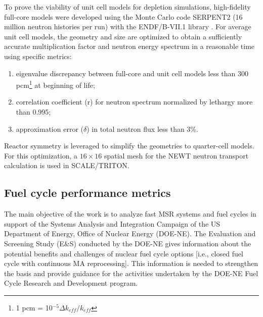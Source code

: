 \documentclass{anstrans}
\begin{document}
To prove the viability of unit cell models for depletion simulations, high-fidelity full-core models were developed using the Monte Carlo code SERPENT2 (16 million neutron histories per run) with the ENDF/B-VII.1 library \cite{leppanen_serpent_2015, chadwick_endf/b-vii.1_2011}. For average unit cell models, the geometry and size are optimized to obtain a sufficiently accurate multiplication factor and neutron energy spectrum in a reasonable time using specific metrics:
\vspace{-0.08in}
\begin{enumerate}
	\item eigenvalue discrepancy between full-core and unit cell models less than 300 pcm\footnote{ 1 pcm = 10$^{-5}\Delta k_{eff}/k_{eff}$} at beginning of life;\vspace{-0.11in}
	\item correlation coefficient (r) for neutron spectrum normalized by lethargy more than 0.995;\vspace{-0.11in}
	\item approximation error ($\delta$) in total neutron flux less than 3\%.\vspace{-0.08in}
\end{enumerate}
Reactor symmetry is leveraged to simplify the geometries to quarter-cell models. For this optimization, a $16\times 16$ spatial mesh for the NEWT neutron transport calculation is used in SCALE/TRITON.

\subsection{Fuel cycle performance metrics} 
\label{sec:metrics}
The main objective of the work is to analyze fast \gls{MSR} systems and fuel cycles in support of the Systems Analysis and Integration Campaign of the US Department of Energy, Office of Nuclear Energy (DOE-NE). The Evaluation and Screening Study (E\&S) conducted by the DOE-NE gives information about the potential benefits and challenges of nuclear fuel cycle options [i.e., closed fuel cycle with continuous \gls{MA} reprocessing]. This information is needed to strengthen the basis and provide guidance for the activities undertaken by the DOE-NE Fuel Cycle Research and Development program.
\end{document}
